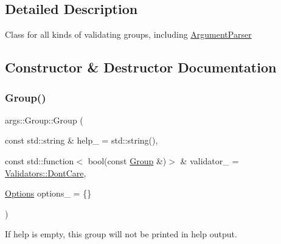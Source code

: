 \subsection{Detailed Description}
Class for all kinds of validating groups, including \hyperlink{classargs_1_1_argument_parser}{Argument\+Parser} 

\subsection{Constructor \& Destructor Documentation}
\mbox{\label{classargs_1_1_group_a7474f489d5452569131406185951c64f}} 
\subsubsection{\texorpdfstring{Group()}{Group()}\hspace{0.1cm}{\footnotesize\ttfamily [1/2]}}
{\footnotesize\ttfamily args\+::\+Group\+::\+Group (\begin{DoxyParamCaption}\item[{const std\+::string \&}]{help\+\_\+ = {\ttfamily std\+:\+:string()},  }\item[{const std\+::function$<$ bool(const \hyperlink{classargs_1_1_group}{Group} \&)$>$ \&}]{validator\+\_\+ = {\ttfamily \hyperlink{structargs_1_1_group_1_1_validators_adf7a904f8fa0d4ea9f1c47ea057a5417}{Validators\+::\+Dont\+Care}},  }\item[{\hyperlink{namespaceargs_aa530c0f95194aa275f49a5f299ac9e77}{Options}}]{options\+\_\+ = {\ttfamily \{\}} }\end{DoxyParamCaption})\hspace{0.3cm}{\ttfamily [inline]}}



If help is empty, this group will not be printed in help output. 

\mbox{\label{classargs_1_1_group_a54598c07578eac848838a21e4dd98657}} 
